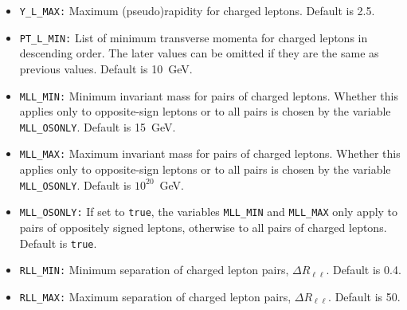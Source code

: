 \documentclass[english,12pt]{article}
\begin{document}
\begin{itemize}
\item {\tt Y\_L\_MAX:} Maximum (pseudo)rapidity for charged leptons. Default is 2.5.
\item {\tt PT\_L\_MIN:} List of minimum transverse momenta for charged leptons
in descending order. The later values can be omitted if they are the same as
previous values. Default is 10~GeV.
\item {\tt MLL\_MIN:} Minimum invariant mass for pairs of charged
  leptons. Whether this applies only to opposite-sign leptons or to all
  pairs is chosen by the variable {\tt MLL\_OSONLY}.
  Default is 15~GeV.
\item {\tt MLL\_MAX:} Maximum invariant mass for pairs of
  charged leptons. Whether this applies only to opposite-sign leptons or to all
  pairs is chosen by the variable {\tt MLL\_OSONLY}.
  Default is $10^{20}$~GeV.
\item {\tt MLL\_OSONLY:} If set to {\tt true}, the variables 
  {\tt MLL\_MIN} and {\tt MLL\_MAX} only apply to pairs of oppositely
  signed leptons, otherwise to all pairs of charged leptons. 
  Default is {\tt true}.
\item {\tt RLL\_MIN:} Minimum separation of charged lepton pairs, $\Delta R_{\ell\ell}$. 
Default is 0.4.
\item {\tt RLL\_MAX:} Maximum separation of  charged lepton pairs, $\Delta R_{\ell\ell}$. 
Default is 50.
\end{itemize}
\end{document}

